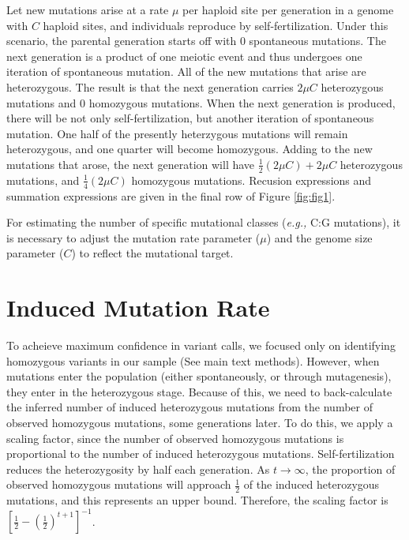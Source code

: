\documentclass[12pt]{article}
\begin{document}
\par Let new mutations arise at a rate $\mu$ per haploid site per generation in
a genome with $C$ haploid sites, and individuals reproduce by
self-fertilization. Under this scenario, the parental generation starts off
with 0 spontaneous mutations. The next generation is a product of one meiotic
event and thus undergoes one iteration of spontaneous mutation. All of the new
mutations that arise are heterozygous. The result is that the next generation
carries $2\mu C$ heterozygous mutations and 0 homozygous mutations. When the
next generation is produced, there will be not only self-fertilization, but
another iteration of spontaneous mutation. One half of the presently
heterzygous mutations will remain heterozygous, and one quarter will become
homozygous. Adding to the new mutations that arose, the next generation will
have $\frac{1}{2}(2\mu C) + 2\mu C$ heterozygous mutations, and
$\frac{1}{4}(2\mu C)$ homozygous mutations. Recusion expressions and summation
expressions are given in the final row of Figure \ref{fig:fig1}.
\par For estimating the number of specific mutational classes (\textit{e.g.,}
C:G mutations), it is necessary to adjust the mutation rate parameter ($\mu$)
and the genome size parameter ($C$) to reflect the mutational target.

\section*{Induced Mutation Rate}
\par To acheieve maximum confidence in variant calls, we focused only on
identifying homozygous variants in our sample (See main text methods).
However, when mutations enter the population (either spontaneously, or
through mutagenesis), they enter in the heterozygous stage. Because of this,
we need to back-calculate the inferred number of induced heterozygous mutations
from the number of observed homozygous mutations, some generations later. To do
this, we apply a scaling factor, since the number of observed homozygous
mutations is proportional to the number of induced heterozygous mutations.
Self-fertilization reduces the heterozygosity by half each generation. As
$t\rightarrow\infty$, the proportion of observed homozygous mutations will
approach $\frac{1}{2}$ of the induced heterozygous mutations, and this
represents an upper bound. Therefore, the scaling factor is 
$[\frac{1}{2} - (\frac{1}{2})^{t+1}]^{-1}$.
\end{document}
